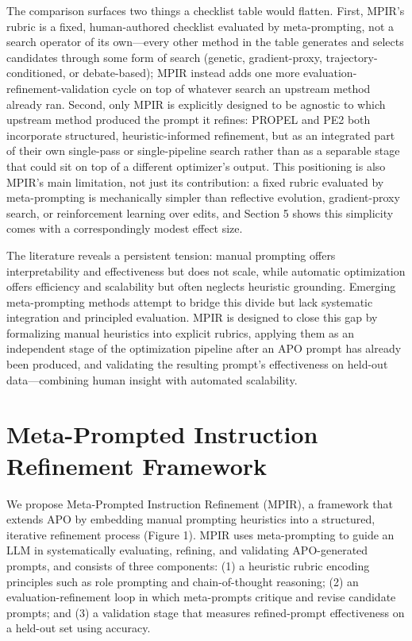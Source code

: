 \documentclass[a4paper,fleqn]{cas-sc}
\begin{document}
The comparison surfaces two things a checklist table would flatten. First, MPIR's rubric is a fixed, human-authored checklist evaluated by meta-prompting, not a search operator of its own---every other method in the table generates and selects candidates through some form of search (genetic, gradient-proxy, trajectory-conditioned, or debate-based); MPIR instead adds one more evaluation-refinement-validation cycle on top of whatever search an upstream method already ran. Second, only MPIR is explicitly designed to be agnostic to which upstream method produced the prompt it refines: PROPEL and PE2 both incorporate structured, heuristic-informed refinement, but as an integrated part of their own single-pass or single-pipeline search rather than as a separable stage that could sit on top of a different optimizer's output. This positioning is also MPIR's main limitation, not just its contribution: a fixed rubric evaluated by meta-prompting is mechanically simpler than reflective evolution, gradient-proxy search, or reinforcement learning over edits, and Section 5 shows this simplicity comes with a correspondingly modest effect size.

The literature reveals a persistent tension: manual prompting offers interpretability and effectiveness but does not scale, while automatic optimization offers efficiency and scalability but often neglects heuristic grounding. Emerging meta-prompting methods attempt to bridge this divide but lack systematic integration and principled evaluation. MPIR is designed to close this gap by formalizing manual heuristics into explicit rubrics, applying them as an independent stage of the optimization pipeline after an APO prompt has already been produced, and validating the resulting prompt's effectiveness on held-out data---combining human insight with automated scalability.

\section{Meta-Prompted Instruction Refinement Framework}

We propose Meta-Prompted Instruction Refinement (MPIR), a framework that extends APO by embedding manual prompting heuristics into a structured, iterative refinement process (Figure 1). MPIR uses meta-prompting to guide an LLM in systematically evaluating, refining, and validating APO-generated prompts, and consists of three components: (1) a heuristic rubric encoding principles such as role prompting and chain-of-thought reasoning; (2) an evaluation-refinement loop in which meta-prompts critique and revise candidate prompts; and (3) a validation stage that measures refined-prompt effectiveness on a held-out set using accuracy.
\end{document}
